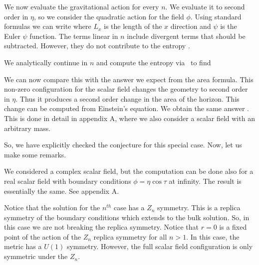 We now evaluate the gravitational action for every $n$. We evaluate it to second order in $\eta$, so we consider
 the quadratic action for the field $\phi$.
Using standard formulas we can write
\eqn{}
where $L_x$ is the length of the $x$ direction and $\psi$ is the Euler $\psi$ function.
 The terms linear in $n$ include divergent terms that should be subtracted.
However, they do not contribute to the entropy \entrog .

We  analytically continue in $n$ and compute the entropy via \entrog\  to find
\eqn{}


We can now compare this with the answer we expect from the area formula.  This non-zero configuration for
the scalar field changes the geometry to second order in $\eta$. Thus it produces a second order change in the
area of the horizon.  This change can be computed from
Einstein's equation. We obtain the same answer \finc . This is done in detail  in appendix A, where we also consider
a scalar field with an arbitrary mass.

So, we have explicitly checked the conjecture for this special case. Now, let us make some remarks.

We considered a complex scalar field, but the computation can be done also for a real scalar field with
boundary conditions $\phi = \eta \cos \tau $ at infinity. The result is essentially the same. See appendix A.

Notice that the solution for the $n^{th}$ case has a $Z_n$ symmetry. This is a replica symmetry of
the boundary conditions which extends to the bulk solution. So, in this case we are not breaking
the replica symmetry. Notice that $r=0$ is a fixed point of the action of the $Z_n$ replica symmetry for
all $n > 1$. In this case, the metric has a $U(1)$ symmetry. However, the full scalar field
configuration is only symmetric
under the $Z_n$.



